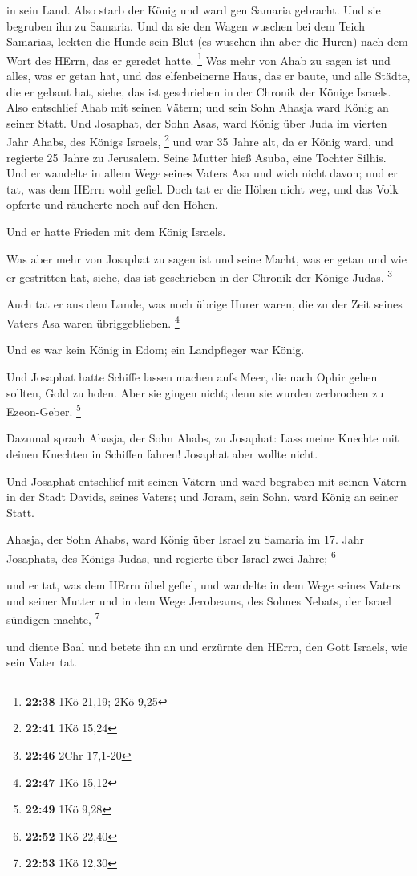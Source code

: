 in sein Land.  Also starb der König und ward gen Samaria
gebracht. Und sie begruben ihn zu Samaria.  Und da sie den
Wagen wuschen bei dem Teich Samarias, leckten die Hunde sein Blut (es
wuschen ihn aber die Huren) nach dem Wort des HErrn, das er geredet
hatte. \footnote{\textbf{22:38} 1Kö 21,19; 2Kö 9,25}  Was
mehr von Ahab zu sagen ist und alles, was er getan hat, und das
elfenbeinerne Haus, das er baute, und alle Städte, die er gebaut hat,
siehe, das ist geschrieben in der Chronik der Könige Israels.
 Also entschlief Ahab mit seinen Vätern; und sein Sohn
Ahasja ward König an seiner Statt.  Und Josaphat, der Sohn
Asas, ward König über Juda im vierten Jahr Ahabs, des Königs Israels,
\footnote{\textbf{22:41} 1Kö 15,24}  und war 35 Jahre alt,
da er König ward, und regierte 25 Jahre zu Jerusalem. Seine Mutter hieß
Asuba, eine Tochter Silhis.  Und er wandelte in allem Wege
seines Vaters Asa und wich nicht davon; und er tat, was dem HErrn wohl
gefiel.  Doch tat er die Höhen nicht weg, und das Volk
opferte und räucherte noch auf den Höhen.

 Und er hatte Frieden mit dem König Israels.

 Was aber mehr von Josaphat zu sagen ist und seine Macht,
was er getan und wie er gestritten hat, siehe, das ist geschrieben in
der Chronik der Könige Judas. \footnote{\textbf{22:46} 2Chr 17,1-20}

 Auch tat er aus dem Lande, was noch übrige Hurer waren,
die zu der Zeit seines Vaters Asa waren übriggeblieben. \footnote{\textbf{22:47}
  1Kö 15,12}

 Und es war kein König in Edom; ein Landpfleger war König.

 Und Josaphat hatte Schiffe lassen machen aufs Meer, die
nach Ophir gehen sollten, Gold zu holen. Aber sie gingen nicht; denn sie
wurden zerbrochen zu Ezeon-Geber. \footnote{\textbf{22:49} 1Kö 9,28}

 Dazumal sprach Ahasja, der Sohn Ahabs, zu Josaphat: Lass
meine Knechte mit deinen Knechten in Schiffen fahren! Josaphat aber
wollte nicht.

 Und Josaphat entschlief mit seinen Vätern und ward
begraben mit seinen Vätern in der Stadt Davids, seines Vaters; und
Joram, sein Sohn, ward König an seiner Statt.

 Ahasja, der Sohn Ahabs, ward König über Israel zu Samaria
im 17. Jahr Josaphats, des Königs Judas, und regierte über Israel zwei
Jahre; \footnote{\textbf{22:52} 1Kö 22,40}

 und er tat, was dem HErrn übel gefiel, und wandelte in dem
Wege seines Vaters und seiner Mutter und in dem Wege Jerobeams, des
Sohnes Nebats, der Israel sündigen machte, \footnote{\textbf{22:53} 1Kö
  12,30}

 und diente Baal und betete ihn an und erzürnte den HErrn,
den Gott Israels, wie sein Vater tat.
